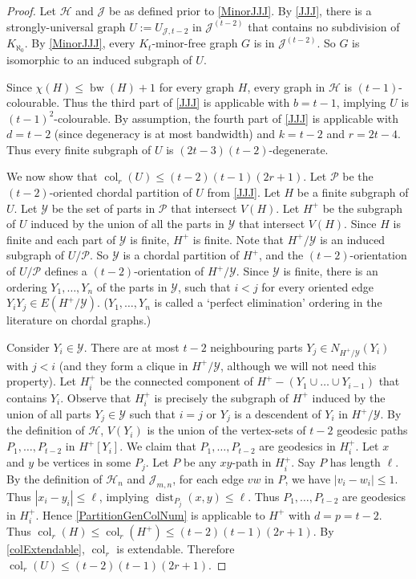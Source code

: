 \documentclass[a4paper,11pt]{article}
\theoremstyle{plain}
\theoremstyle{definition}
\renewcommand{\leq}{\leqslant}
\DeclareMathOperator{\bw}{bw}
\DeclareMathOperator{\dist}{dist}
\DeclareMathOperator{\col}{col}
\newcommand{\YY}{\mathcal{Y}}
\newcommand{\HH}{\mathcal{H}}
\newcommand{\JJ}{\mathcal{J}}
\newcommand{\PART}{\mathcal{P}}
\begin{document}
\begin{proof}
Let $\HH$ and $\JJ$ be as defined prior to \cref{MinorJJJ}. By \cref{JJJ}, there is a strongly-universal graph $U:=U_{\JJ,t-2}$ in $\JJ^{(t-2)}$ that contains no subdivision of $K_{\aleph_0}$. By \cref{MinorJJJ}, every $K_t$-minor-free graph $G$ is in $\JJ^{(t-2)}$. So $G$ is isomorphic to an induced subgraph of $U$. 

Since $\chi(H)\leq\bw(H)+1$ for every graph $H$, every graph in $\HH$ is $(t-1)$-colourable. Thus the third part of \cref{JJJ} is applicable with $b=t-1$, implying $U$ is $(t-1)^2$-colourable. By assumption, the fourth part of \cref{JJJ} is applicable with $d=t-2$ (since degeneracy is at most bandwidth) and $k=t-2$ and $r=2t-4$. Thus every finite subgraph of $U$ is $(2t-3)(t-2)$-degenerate.

We now show that $\col_r(U) \leq (t-2)(t-1)(2r+1)$. Let $\PART$ be the $(t-2)$-oriented chordal partition of $U$ from \cref{JJJ}. Let $H$ be a finite subgraph of $U$. Let $\YY$ be the set of parts in $\PART$ that intersect $V(H)$. Let $H^+$ be the subgraph of $U$ induced by the union of all the parts in $\YY$ that intersect $V(H)$. Since $H$ is finite and each part of $\YY$ is finite, $H^+$ is finite. Note that $H^+/\YY$ is an induced subgraph of $U /\PART$. So $\YY$ is a chordal partition of $H^+$, and the $(t-2)$-orientation of $U/\PART$ defines a $(t-2)$-orientation of $H^+/\YY$. Since $\YY$ is finite, there is an ordering $Y_1,\dots,Y_n$ of the parts in $\YY$, such that $i<j$ for every oriented edge $Y_iY_j\in E(H^+/\YY)$. ($Y_1,\dots,Y_n$ is called a `perfect elimination' ordering in the literature on chordal graphs.)\

Consider $Y_i\in\YY$. There are at most $t-2$ neighbouring parts $Y_j\in N_{H^+/\YY}(Y_i)$ with $j<i$ (and they form a clique in $H^+/\YY$, although we will not need this property). Let $H^+_i$ be the connected component of $H^+-(Y_1\cup\dots\cup Y_{i-1})$ that contains $Y_i$. Observe that $H^+_i$ is precisely the subgraph of $H^+$ induced by the union of all parts $Y_j\in\YY$ such that $i=j$ or $Y_j$ is a descendent of $Y_i$ in $H^+/\YY$. By the definition of $\HH$, $V(Y_i)$ is the union of the vertex-sets of $t-2$ geodesic paths $P_1,\dots,P_{t-2}$ in $H^+[Y_i]$. We claim that $P_1,\dots,P_{t-2}$ are geodesics in $H^+_i$. Let $x$ and $y$ be vertices in some $P_j$. Let $P$ be any $xy$-path in $H^+_i$. Say $P$ has length $\ell$. By the definition of $\HH_n$ and $\JJ_{m,n}$, for each edge $vw$ in $P$, we have $|v_i-w_i|\leq 1$. Thus $|x_i-y_i|\leq\ell$, implying $\dist_{P_j}(x,y)\leq\ell$. 
Thus $P_1,\dots,P_{t-2}$ are geodesics in $H^+_i$. 
Hence \cref{PartitionGenColNum} is applicable to $H^+$ with $d=p=t-2$. Thus $\col_r(H) \leq \col_r(H^+) \leq (t-2)(t-1)(2r+1)$. 
By \cref{colExtendable}, $\col_r$ is extendable.
Therefore $\col_r(U) \leq (t-2)(t-1)(2r+1)$. 
\end{proof}
\end{document}
